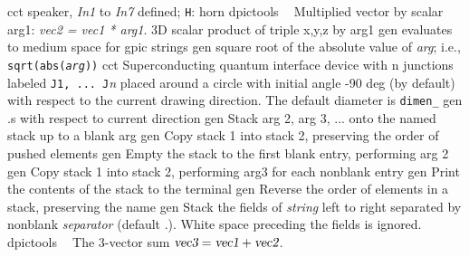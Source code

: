 %
  {cct}%
  {speaker, {\sl In1} to {\sl In7} defined; {\tt H}: horn
   }%
%
  {dpictools}%
  {$\;\;$ Multiplied vector by scalar arg1: {\sl vec2 = vec1 * arg1}.}%
%
  {3D} {scalar product of triple x,y,z by arg1}%
%
  {gen}%
  {evaluates to medium space for gpic strings}%
%
  {gen}%
  {square root of the absolute value of {\sl arg}; i.e.,
   {\tt sqrt(abs({\sl arg}))}}%
%
  {cct}%
  {Superconducting quantum interface device
   with {\sl }n junctions labeled {\tt J1, ... J}{\sl n} placed around
   a circle with initial angle -90 deg (by default) with respect to the
   current drawing direction. The default diameter is {\tt dimen\_} }%
%
  {gen}%
  {.s with respect to current direction}%
%
  {gen}%
  {Stack arg 2, arg 3, ... onto the named stack up to a blank arg}%
%
  {gen}%
  {Copy stack 1 into stack 2, preserving the order of pushed elements}%
%
  {gen}%
  {Empty the stack to the first blank entry, performing arg 2}%
%
  {gen}%
  {Copy stack 1 into stack 2, performing arg3 for each nonblank
  entry}%
%
  {gen}%
  {Print the contents of the stack to the terminal}%
%
  {gen}%
  {Reverse the order of elements in a stack, preserving the name}%
%
  {gen}%
  {Stack the fields of {\sl string} left to right separated
  by nonblank
    {\sl separator} (default .).  White space preceding the fields
    is ignored.}%
%
  {dpictools}%
  {$\;\;$ The 3-vector sum
    $\hbox{\sl vec3} = \hbox{\sl vec1} + \hbox{\sl vec2}$.}%
